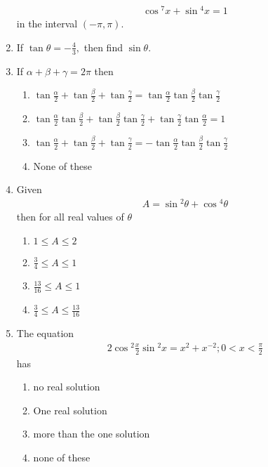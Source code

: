 \begin{enumerate}[label=\arabic*.,ref=\thesubsection.\theenumi]
    \begin{align}
    \cos{^7x} + \sin{^4 x} = 1
    \end{align} 
    in the interval $(-\pi , \pi)$.
    \item If $\tan{\theta} = -\frac{4}{3},$ then find $\sin{\theta}.$ 
    \item If $\alpha+\beta+\gamma = 2\pi$ then 
    \begin{enumerate}
        \item $\tan{\frac{\alpha}{2}}+\tan{\frac{\beta}{2}}+\tan{\frac{\gamma}{2}} = \tan{\frac{\alpha}{2}}\tan{\frac{\beta}{2}}\tan{\frac{\gamma}{2}}$\\
        \item $\tan{\frac{\alpha}{2}} \tan{\frac{\beta}{2}}+\tan{\frac{\beta}{2}} \tan{\frac{\gamma}{2}}+\tan{\frac{\gamma}{2}} \tan{\frac{\alpha}{2}} = 1$\\
        \item $\tan{\frac{\alpha}{2}}+\tan{\frac{\beta}{2}}+\tan{\frac{\gamma}{2}} = -\tan{\frac{\alpha}{2}}\tan{\frac{\beta}{2}}\tan{\frac{\gamma}{2}}$\\
        \item None of these
    \end{enumerate}
    \item Given 
    \begin{align}
    A = \sin{^2 \theta} + \cos{^4 \theta}
    \end{align} then for all real values of $\theta$
    \begin{enumerate}
        \item $1\leq A \leq 2$
        \item $\frac{3}{4}\leq A \leq 1$
        \item $\frac{13}{16}\leq A \leq 1$
        \item $\frac{3}{4}\leq A \leq \frac{13}{16}$
    \end{enumerate}
   \item The equation 
   \begin{align}
       2\cos{^2\frac{x}{2}}\sin{^2 x} = x^2 + x^{-2};
       0<x<\frac{\pi}{2}
   \end{align} 
   has
   \begin{enumerate}
       \item no real solution
       \item One real solution
       \item more than the one solution
       \item none of these
   \end{enumerate}

\end{enumerate}
